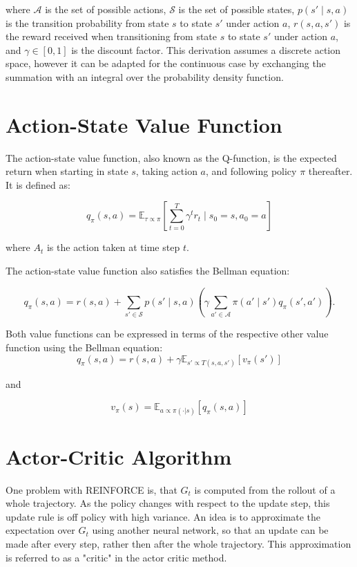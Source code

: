 where $\mathcal{A}$ is the set of possible actions, $\mathcal{S}$ is the set of possible states, $p(s' \mid s,a)$ is the transition probability 
from state $s$ to state $s'$ under action $a$, $r(s,a,s')$ is the reward received when transitioning from state $s$ to state $s'$ under 
action $a$, and $\gamma \in [0,1]$ is the discount factor. This derivation assumes a discrete action space,
however it can be adapted for the continuous case by exchanging the summation with an integral over the probability density function.

\section{Action-State Value Function}

The action-state value function, also known as the Q-function, is the expected return when starting in state $s$, taking action $a$, and following 
policy $\pi$ thereafter. It is defined as:

\begin{equation}
    q_{\pi}(s, a) = \mathbb{E}_{\tau \propto \pi}\left[\sum_{t=0}^T \gamma^t r_t \mid s_0 = s, a_0=a\right]
\end{equation}

where $A_t$ is the action taken at time step $t$.

The action-state value function also satisfies the Bellman equation:

\begin{equation}
    \label{bmeq_q}
    q_{\pi}(s,a) = r(s,a) + \sum_{s' \in \mathcal{S}} p(s' \mid s,a) \left(\gamma \sum_{a' \in \mathcal{A}} \pi(a' \mid s') q_{\pi}(s',a')\right).
\end{equation}

Both value functions can be expressed in terms of the respective other value function using the Bellman equation:
\begin{equation}
    \label{q_from_v}
    q_{\pi}(s,a) = r(s,a) + \gamma \mathbb{E}_{s'\propto T(s,a,s')}\left[ v_{\pi}(s') \right]
\end{equation}

and 

\begin{equation}
    v_{\pi}(s) = \mathbb{E}_{a \propto \pi(\cdot|s)} \left[ q_\pi(s,a) \right]
\end{equation}



\section{Actor-Critic Algorithm}
One problem with REINFORCE is, that $G_t$ is computed from the rollout of a whole trajectory. As the policy changes with respect to the update step, this update 
rule is off policy with high variance. An idea is to approximate the expectation over $G_t$ using another neural network, so that an update can be made after every step, 
rather then after the whole trajectory. This approximation is referred to as a "critic" in the actor critic method.
